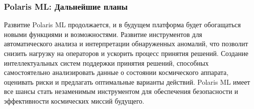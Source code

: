 \documentclass[14pt, a4paper]{extreport}
\begin{document}
    \subsubsection{Polaris ML: Дальнейшие планы}
    Развитие Polaris ML продолжается, и в будущем платформа будет обогащаться новыми функциями и возможностями.
    Развитие инструментов для автоматического анализа и интерпретации обнаруженных аномалий, что позволит снизить нагрузку на операторов и ускорить процесс принятия решений.
    Создание интеллектуальных систем поддержки принятия решений, способных самостоятельно анализировать данные о состоянии космического аппарата, оценивать риски и предлагать оптимальные варианты действий.
    Polaris ML имеет все шансы стать незаменимым инструментом для обеспечения безопасности и эффективности космических миссий будущего.

    \newpage

    
    
\end{document}
